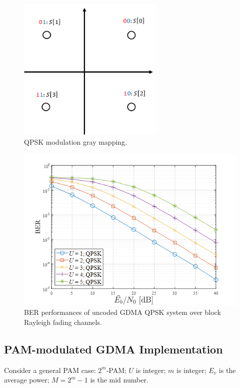 \begin{figure}
 \centering
 \includegraphics[width=7cm]{fig/qpsk_gray_mapping.png}
 \caption{QPSK modulation gray mapping.}
 \label{fig:qpsk_gray_mapping}
\end{figure}

\begin{figure}[H]
 \centering
 \includegraphics[width=15cm]{fig/gdma_qpsk_implement.png}
 \caption{BER performances of uncoded GDMA QPSK system over block Rayleigh fading channels.}
 \label{fig:qpsk_implementation}
\end{figure}

\subsection{PAM-modulated GDMA Implementation}

Consider a general PAM case: $2^m$-PAM; $U$ is integer; $m$ is integer; $E_v$  is the average power; $M=2^m-1$ is the mid number.

